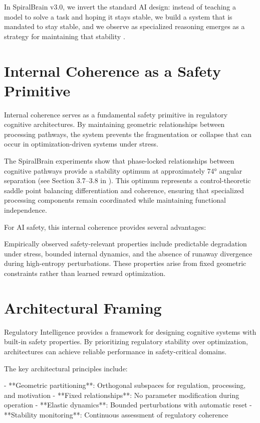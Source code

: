 \documentclass[12pt,a4paper]{report}
\begin{document}
In SpiralBrain v3.0, we invert the standard AI design: instead of teaching a model to solve a task and hoping it stays stable, we build a system that is mandated to stay stable, and we observe as specialized reasoning emerges as a strategy for maintaining that stability \cite{Cragin2026RI}.

\section{Internal Coherence as a Safety Primitive}

Internal coherence serves as a fundamental safety primitive in regulatory cognitive architectures. By maintaining geometric relationships between processing pathways, the system prevents the fragmentation or collapse that can occur in optimization-driven systems under stress.

The SpiralBrain experiments show that phase-locked relationships between cognitive pathways provide a stability optimum at approximately 74° angular separation (see Section 3.7–3.8 in \cite{Cragin2026RI}). This optimum represents a control-theoretic saddle point balancing differentiation and coherence, ensuring that specialized processing components remain coordinated while maintaining functional independence.

For AI safety, this internal coherence provides several advantages:

Empirically observed safety-relevant properties include predictable degradation under stress, bounded internal dynamics, and the absence of runaway divergence during high-entropy perturbations. These properties arise from fixed geometric constraints rather than learned reward optimization.

\section{Architectural Framing}

Regulatory Intelligence provides a framework for designing cognitive systems with built-in safety properties. By prioritizing regulatory stability over optimization, architectures can achieve reliable performance in safety-critical domains.

The key architectural principles include:

- **Geometric partitioning**: Orthogonal subspaces for regulation, processing, and motivation
- **Fixed relationships**: No parameter modification during operation
- **Elastic dynamics**: Bounded perturbations with automatic reset
- **Stability monitoring**: Continuous assessment of regulatory coherence
\end{document}
